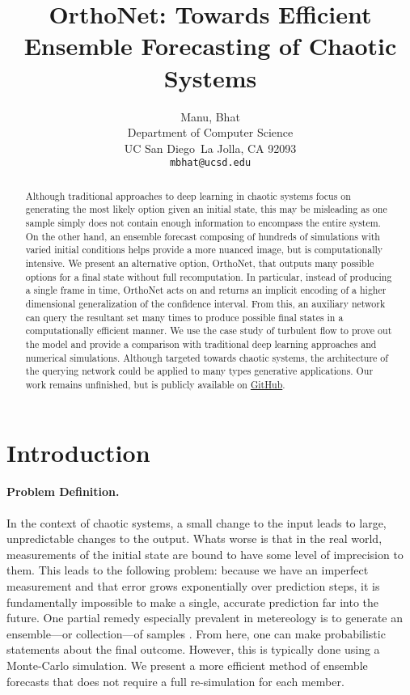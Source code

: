 \documentclass{article}
\title{OrthoNet: Towards Efficient Ensemble Forecasting of Chaotic Systems}
\author{%
    Manu, Bhat \\
    Department of Computer Science\\
    UC San Diego\
    La Jolla, CA 92093 \\
    \texttt{mbhat@ucsd.edu} \\
}
\begin{document}
    \maketitle


    \begin{abstract}
        Although traditional approaches to deep learning in chaotic systems focus on generating the most likely option given an initial state, this may be misleading as one sample simply does not contain enough information to encompass the entire system. On the other hand, an ensemble forecast composing of hundreds of simulations with varied initial conditions helps provide a more nuanced image, but is computationally intensive. We present an alternative option, OrthoNet, that outputs many possible options for a final state without full recomputation. In particular, instead of producing a single frame in time, OrthoNet acts on and returns an implicit encoding of a higher dimensional generalization of the confidence interval. From this, an auxiliary network can query the resultant set many times to produce possible final states in a computationally efficient manner. We use the case study of turbulent flow to prove out the model and provide a comparison with traditional deep learning approaches and numerical simulations. Although targeted towards chaotic systems, the architecture of the querying network could be applied to many types generative applications. Our work remains unfinished, but is publicly available on \href{https://github.com/enigmurl/tf-net-confidence-domain}{GitHub}.
    \end{abstract}

    \section{Introduction}

    \paragraph{Problem Definition.}

    In the context of chaotic systems, a small change to the input leads to large, unpredictable changes to the output. Whats worse is that in the real world, measurements of the initial state are bound to have some level of imprecision to them. This leads to the following problem: because we have an imperfect measurement and that error grows exponentially over prediction steps, it is fundamentally impossible to make a single, accurate prediction far into the future. One partial remedy especially prevalent in metereology is to generate an ensemble—or collection—of samples \cite{TyphoonEnsemblePredictionSystemDevelopedattheJapanMeteorologicalAgency}. From here, one can make probabilistic statements about the final outcome. However, this is typically done using a Monte-Carlo simulation. We present a more efficient method of ensemble forecasts that does not require a full re-simulation for each member.
\end{document}
